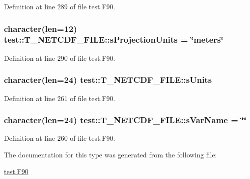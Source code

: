 Definition at line 289 of file test.F90.

\hypertarget{typetest_1_1_t___n_e_t_c_d_f___f_i_l_e_a88495338566a424a7714af57cc05975b}{
\subsubsection[{sProjectionUnits}]{\setlength{\rightskip}{0pt plus 5cm}character(len=12) {\bf test::T\_\-NETCDF\_\-FILE::sProjectionUnits} = \char`\"{}meters\char`\"{}}}
\label{typetest_1_1_t___n_e_t_c_d_f___f_i_l_e_a88495338566a424a7714af57cc05975b}


Definition at line 290 of file test.F90.

\hypertarget{typetest_1_1_t___n_e_t_c_d_f___f_i_l_e_a7c0c5c02249ac0c691093ae836df2cb7}{
\subsubsection[{sUnits}]{\setlength{\rightskip}{0pt plus 5cm}character(len=24) {\bf test::T\_\-NETCDF\_\-FILE::sUnits}}}
\label{typetest_1_1_t___n_e_t_c_d_f___f_i_l_e_a7c0c5c02249ac0c691093ae836df2cb7}


Definition at line 261 of file test.F90.

\hypertarget{typetest_1_1_t___n_e_t_c_d_f___f_i_l_e_a4c6b747a38c3fd15915f1c9b20c76738}{
\subsubsection[{sVarName}]{\setlength{\rightskip}{0pt plus 5cm}character(len=24) {\bf test::T\_\-NETCDF\_\-FILE::sVarName} = \char`\"{}\char`\"{}}}
\label{typetest_1_1_t___n_e_t_c_d_f___f_i_l_e_a4c6b747a38c3fd15915f1c9b20c76738}


Definition at line 260 of file test.F90.



The documentation for this type was generated from the following file:\begin{DoxyCompactItemize}
\item 
\hyperlink{test_8_f90}{test.F90}\end{DoxyCompactItemize}
